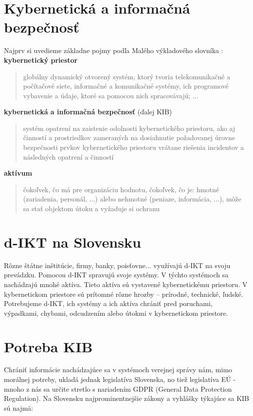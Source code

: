 \section{Kybernetická a informačná bezpečnosť}
Najprv si uvedieme základne pojmy podľa Malého výkladového slovníka \cite{KUDIaKB-MVS}: \\

\textbf{kybernetický priestor}
\begin{quote}
  globálny dynamický otvorený systém, ktorý tvoria
  telekomunikačné a počítačové siete,
  informačné a komunikačné systémy, ich
  programové vybavenie a údaje, ktoré sa
  pomocou nich spracovávajú; ...
\end{quote}


\textbf{kybernetická a informačná bezpečnosť} (ďalej KIB)
\begin{quote}
  systém opatrení na zaistenie odolnosti
  kybernetického priestoru, ako aj činností a
  prostriedkov zameraných na dosiahnutie
  požadovanej úrovne bezpečnosti prvkov
  kybernetického priestoru vrátane riešenia
  incidentov a následných opatrení a činností
\end{quote}

\textbf{aktívum}
\begin{quote}
  čokoľvek, čo má pre organizáciu hodnotu, čokoľvek, čo je: 
    hmotné (zariadenia, personál, ...) alebo nehmotné (peniaze, informácia, ...),
    môže sa stať objektom útoku a
    vyžaduje si ochranu
\end{quote}

\section{d-IKT na Slovensku}
Rôzne štátne inštitúcie, firmy, banky, poisťovne... využívajú d-IKT na svoju prevádzku. Pomocou d-IKT spravujú svoje 
systémy. V týchto systémoch sa nachádzajú mnohé aktíva. Tieto aktíva sú vystavené kybernetickému priestoru. 
V kybernetickom priestore sú prítomné rôzne hrozby -- prírodné, technické, ľudské.
Potrebujeme d-IKT, ich systémy a ich aktíva chrániť pred poruchami, výpadkami, chybami, odcudzením alebo útokmi v 
kybernetickom priestore.

\section{Potreba KIB}
Chrániť informácie nachádzajúce sa v systémoch verejnej správy nám, mimo morálnej potreby, ukladá jednak legislatíva 
Slovenska, no tiež legislatíva EÚ - mnoho z nás sa určite stretlo s nariadením GDPR (General Data Protection Regulation). 
Na Slovensku najprominentnejšie zákony a vyhlášky týkajúce sa KIB sú najmä:

